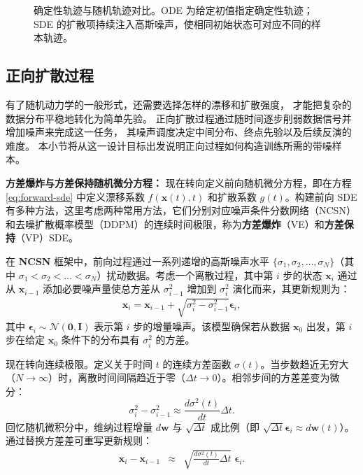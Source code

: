 \begin{figure}[!t]
\centering
{}
\caption{确定性轨迹与随机轨迹对比。ODE 为给定初值指定确定性轨迹；SDE 的扩散项持续注入高斯噪声，使相同初始状态可对应不同的样本轨迹。}
\label{fig:forward-sde-example}
\end{figure}

\subsection{正向扩散过程}

有了随机动力学的一般形式，还需要选择怎样的漂移和扩散强度，
才能把复杂的数据分布平稳地转化为简单先验。
正向扩散过程通过随时间逐步削弱数据信号并增加噪声来完成这一任务，
其噪声调度决定中间分布、终点先验以及后续反演的难度。
本小节将从这一设计目标出发说明正向过程如何构造训练所需的带噪样本。


\textbf{方差爆炸与方差保持随机微分方程：} 现在转向定义前向随机微分方程，即在方程 \eqref{eq:forward-sde} 中定义漂移系数 $f(\mathbf{x}(t),t)$ 和扩散系数 $g(t)$。构建前向 SDE 有多种方法，这里考虑两种常用方法，它们分别对应噪声条件分数网络（NCSN）和去噪扩散概率模型（DDPM）的连续时间极限，称为\textbf{方差爆炸}（VE）和\textbf{方差保持}（VP）SDE。

在 \textbf{NCSN} 框架中，前向过程通过一系列递增的高斯噪声水平 $\{\sigma_1, \sigma_2, \dots, \sigma_N\}$（其中 $\sigma_1 < \sigma_2 < \dots < \sigma_N$）扰动数据。考虑一个离散过程，其中第 $i$ 步的状态 $\mathbf{x}_i$ 通过从 $\mathbf{x}_{i-1}$ 添加必要噪声量使总方差从 $\sigma_{i-1}^2$ 增加到 $\sigma_i^2$ 演化而来，其更新规则为：
\begin{eqnarray}
\mathbf{x}_i = \mathbf{x}_{i-1} + \sqrt{\sigma_i^2 - \sigma_{i-1}^2} \boldsymbol{\epsilon}_i,
\end{eqnarray}
其中 $\boldsymbol{\epsilon}_i \sim \mathcal{N}(\mathbf{0}, \mathbf{I})$ 表示第 $i$ 步的增量噪声。该模型确保若从数据 $\mathbf{x}_0$ 出发，第 $i$ 步在给定 $\mathbf{x}_0$ 条件下的分布具有 $\sigma_i^2$ 的方差。

现在转向连续极限。定义关于时间 $t$ 的连续方差函数 $\sigma(t)$。当步数趋近无穷大（$N \to \infty$）时，离散时间间隔趋近于零（$\Delta t \to 0$）。相邻步间的方差差变为微分：
\begin{equation}
\sigma_i^2 - \sigma_{i-1}^2 \approx \frac{d\sigma^2(t)}{dt} \Delta t.
\end{equation}
回忆随机微积分中，维纳过程增量 $d\mathbf{w}$ 与 $\sqrt{\Delta t}$ 成比例（即 $\sqrt{\Delta t} \boldsymbol{\epsilon}_i \approx d\mathbf{w}(t)$）。通过替换方差差可重写更新规则：
\begin{eqnarray}
\mathbf{x}_i - \mathbf{x}_{i-1} & \approx & \sqrt{\frac{d\sigma^2(t)}{dt} \Delta t} \; \boldsymbol{\epsilon}_i.
\end{eqnarray}

